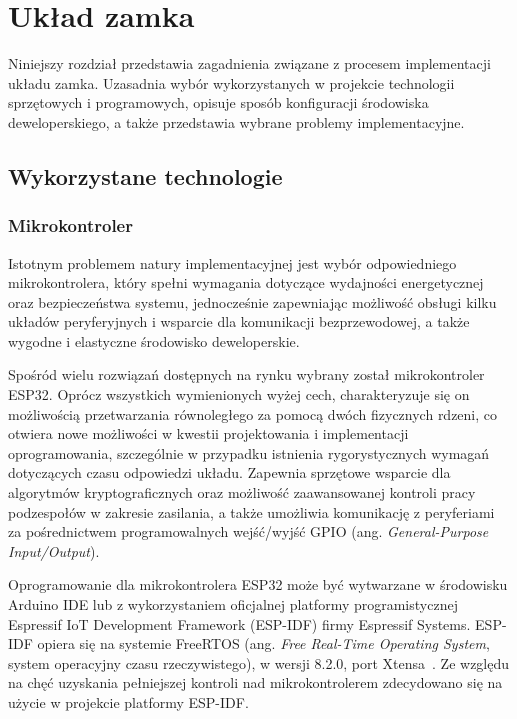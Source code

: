 \chapter{Układ zamka}
\label{chap:controller}

    Niniejszy rozdział przedstawia zagadnienia związane z procesem implementacji układu zamka. Uzasadnia wybór wykorzystanych w projekcie technologii sprzętowych i programowych, opisuje sposób konfiguracji środowiska deweloperskiego, a także przedstawia wybrane problemy implementacyjne.

    \section{Wykorzystane technologie}

        \subsection{Mikrokontroler}

            Istotnym problemem natury implementacyjnej jest wybór odpowiedniego mikrokontrolera, który spełni wymagania dotyczące wydajności energetycznej oraz bezpieczeństwa systemu, jednocześnie zapewniając możliwość obsługi kilku układów peryferyjnych i wsparcie dla komunikacji bezprzewodowej, a także wygodne i elastyczne środowisko deweloperskie.

            Spośród wielu rozwiązań dostępnych na rynku wybrany został mikrokontroler ESP32. Oprócz wszystkich wymienionych wyżej cech, charakteryzuje się on możliwością przetwarzania równoległego za pomocą dwóch fizycznych rdzeni, co otwiera nowe możliwości w kwestii projektowania i implementacji oprogramowania, szczególnie w przypadku istnienia rygorystycznych wymagań dotyczących czasu odpowiedzi układu. Zapewnia sprzętowe wsparcie dla algorytmów kryptograficznych oraz możliwość zaawansowanej kontroli pracy podzespołów w zakresie zasilania, a także umożliwia komunikację z peryferiami za pośrednictwem programowalnych wejść/wyjść GPIO (ang. \textit{General-Purpose Input/Output}).

            Oprogramowanie dla mikrokontrolera ESP32 może być wytwarzane w środowisku Arduino IDE lub z wykorzystaniem oficjalnej platformy programistycznej Espressif IoT Development Framework (ESP-IDF) firmy Espressif Systems. ESP-IDF opiera się na systemie FreeRTOS (ang. \textit{Free Real-Time Operating System}, system operacyjny czasu rzeczywistego), w wersji 8.2.0, port Xtensa~\cite{esp-idf-freertos-smp-changes}. Ze względu na chęć uzyskania pełniejszej kontroli nad mikrokontrolerem zdecydowano się na użycie w projekcie platformy ESP-IDF.


